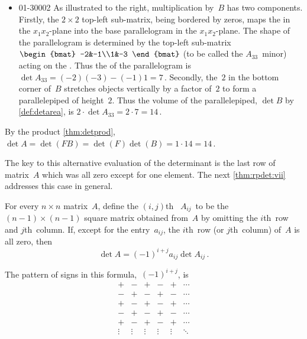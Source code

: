 \begin{example}
\begin{solution}
\begin{itemize}
\begin{itemize}
\item 
\begin{figbox}{01{-3}000{2}}
As illustrated  to the right, multiplication by~\(B\) has two components.
Firstly,  the \(2\times2\) top-left sub-matrix, being bordered by zeros, maps the  in the \(x_1x_2\)-plane into the base parallelogram in the \(x_1x_2\)-plane.
The shape of the parallelogram is determined by the top-left sub-matrix \(\begin{bmat} -2&-1\\1&-3 \end{bmat}\) (to be called the \(A_{33}\)~minor) acting on the .
Thus the  of the parallelogram is \(\det A_{33}=(-2)(-3)-(-1)1=7\)\,.
Secondly, the~\(2\) in the bottom corner of~\(B\) stretches objects vertically by a factor of~\(2\) to form a parallelepiped of height~\(2\).
Thus the volume of the parallelepiped, \(\det B\) by \cref{def:detarea}, is \(2\cdot\det A_{33}=2\cdot 7=14\)\,.
\end{figbox}

\end{itemize}
By the product \cref{thm:detprod},
\(\det A=\det(FB)=\det(F)\det(B)=1\cdot14=14\)\,.

\end{itemize}
The key to this alternative evaluation of the determinant is the last row of matrix~\(A\) which was all zero except for one element.
The next \cref{thm:rpdet:vii} addresses this case in general.
\end{solution}
\end{example}











\begin{theorem} \label{thm:rpdet:vii} 
%
For every \(n\times n\) matrix~\(A\),
define the \((i,j)\)th~ \(A_{ij}\)~to be the \((n-1)\times(n-1)\) square matrix obtained from~\(A\) by omitting the \(i\)th~row and \(j\)th~column.  
If, except for the entry~\(a_{ij}\), the \(i\)th~row (or \(j\)th~column) of~\(A\) is all zero, then 
\begin{equation}
\det A=(-1)^{i+j}a_{ij}\det A_{ij}\,.
\label{eq:rpdet:vii}
\end{equation}
\end{theorem}
The pattern of signs in this formula,~\((-1)^{i+j}\), is 
\begin{equation*}
\begin{matrix} +&-&+&-&+&\cdots
\\-&+&-&+&-&\cdots
\\+&-&+&-&+&\cdots
\\-&+&-&+&-&\cdots
\\+&-&+&-&+&\cdots
\\\vdots&\vdots&\vdots&\vdots&\vdots&\ddots \end{matrix}
\end{equation*}

